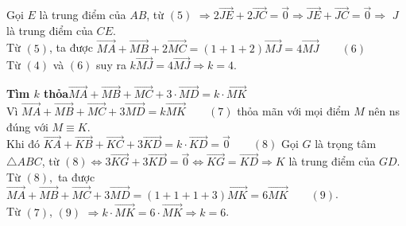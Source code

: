 \begin{bt}
{\begin{listEX}[1]
			Gọi $E$ là trung điểm của $AB$, từ $(5)$ $\Rightarrow 2\overrightarrow{JE}+2\overrightarrow{JC}=\overrightarrow{0}\Rightarrow \overrightarrow{JE}+\overrightarrow{JC}=\overrightarrow{0}\Rightarrow  $ $J$ là trung điểm của $CE$.\\
			Từ $(5)$, ta được $\overrightarrow{MA}+\overrightarrow{MB}+2\overrightarrow{MC}=(1+1+2)\overrightarrow{MJ}=4\overrightarrow{MJ}\qquad (6)$\\
			Từ $(4)$ và $(6)$ suy ra $k\overrightarrow{MJ}=4\overrightarrow{MJ}\Rightarrow k=4$.
			\item \textbf{Tìm $k$ thỏa}$\overrightarrow{MA}+\overrightarrow{MB}+\overrightarrow{MC}+3\cdot\overrightarrow{MD}=k\cdot\overrightarrow{MK}$\\
			Vì $\overrightarrow{MA}+\overrightarrow{MB}+\overrightarrow{MC}+3\overrightarrow{MD}=k\overrightarrow{MK}\qquad (7)$ thỏa mãn với mọi điểm $M$ nên ns đúng với $M\equiv K$.\\
			Khi đó $\overrightarrow{KA}+\overrightarrow{KB}+\overrightarrow{KC}+3\overrightarrow{KD}=k\cdot\overrightarrow{KD}=\overrightarrow{0}\qquad (8)$
			Gọi $G$ là trọng tâm $\triangle ABC$, từ $(8)\Leftrightarrow 3\overrightarrow{KG}+3\overrightarrow{KD}=\overrightarrow{0}\Leftrightarrow \overrightarrow{KG}=\overrightarrow{KD}\Rightarrow K$ là trung điểm của $GD$.\\
			Từ $(8),$ ta được $\overrightarrow{MA}+\overrightarrow{MB}+\overrightarrow{MC}+3\overrightarrow{MD}=(1+1+1+3)\overrightarrow{MK}=6\overrightarrow{MK}\qquad (9)$.\\
			Từ $(7)$, $(9)$ $\Rightarrow k\cdot\overrightarrow{MK}=6\cdot\overrightarrow{MK}\Rightarrow k= 6$.
		\end{listEX}
	}
\end{bt}

